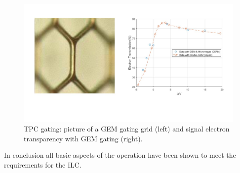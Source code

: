 \begin{figure}[t!]
\centering
\includegraphics[width=1.0\hsize]{Detector/fig/TPC_gating.jpg}
\caption{TPC gating: picture of a GEM gating grid (left) and signal electron transparency with GEM gating (right).} 
\label{fig:det:TPC_gating}
\end{figure}

In conclusion all basic aspects of the operation have been shown to meet the requirements for the ILC. 
\vspace{3cm}